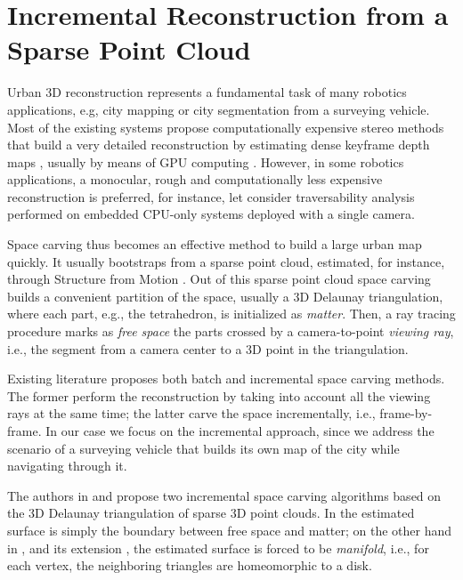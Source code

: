 \chapter{Incremental Reconstruction from a Sparse Point Cloud}

Urban 3D reconstruction represents a fundamental task of many robotics applications, e.g, city mapping \cite{pollefeys_et_al_08} or city segmentation \cite{Hane_et_al_09} from a surveying vehicle.
Most of the existing systems propose computationally expensive stereo methods that build a very detailed reconstruction by estimating dense keyframe depth maps , usually by means of GPU computing \cite{pollefeys_et_al_08,Cornelis_et_al08}. 
However, in some robotics applications, a monocular, rough and computationally less expensive reconstruction is preferred,  for instance, let consider traversability analysis performed on embedded CPU-only systems deployed with a single camera.

Space carving \cite{Seitz_et_al06} thus becomes an effective method to build  a large urban map quickly. 
It usually bootstraps from a sparse point cloud, estimated, for instance, through Structure from Motion \cite{Snavely_et_al06}. 
Out of this sparse point cloud space carving builds a convenient partition of the space, usually a 3D Delaunay triangulation, where each part, e.g., the tetrahedron, is initialized as \emph{matter}.
Then, a ray tracing procedure marks as \emph{free space} the parts  crossed by a camera-to-point \emph{viewing ray}, i.e., the segment from a camera center to a 3D point in the triangulation. 

Existing literature proposes both batch \cite{Pan_et_al09} and incremental \cite{litvinov_lhuillier_13,Lovi_et_al_11} space carving methods.
The former perform the reconstruction by taking into account all the viewing rays at the same time; the latter carve the space incrementally, i.e., frame-by-frame.
In our case we focus on the incremental approach, since we address the scenario of a surveying vehicle that builds its own map of the city while navigating through it.

The authors in \cite{Lovi_et_al_11}  and \cite{litvinov_lhuillier_13} propose two incremental space carving algorithms based on the 3D Delaunay triangulation of sparse 3D point clouds. 
In \cite{Lovi_et_al_11} the estimated surface is simply the boundary between free space and matter; on the other hand in \cite{litvinov_lhuillier_13}, and its extension \cite{litvinov_Lhiuller14}, the estimated surface is forced to be \emph{manifold}, i.e., for each vertex, the neighboring triangles are homeomorphic to a disk. 

